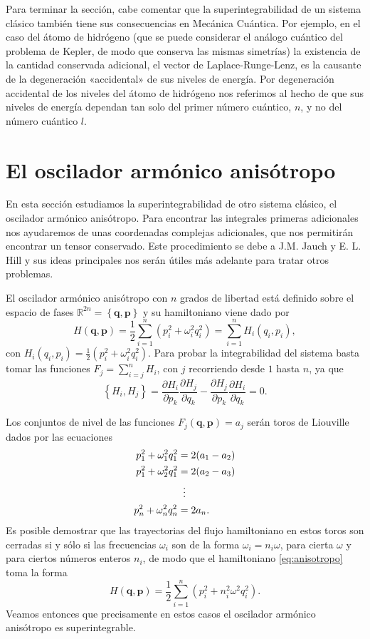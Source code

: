 \documentclass[12pt,a4paper,twoside]{article}
\theoremstyle{definition} \newtheorem{defn}[thm]{Definición}
\theoremstyle{definition} \newtheorem{ejemplo}[thm]{Ejemplo}
\theoremstyle{definition} \newtheorem{ejercicio}[thm]{Ejercicio}
\theoremstyle{remark} \newtheorem*{obs}{Observación}
\def\RR{\mathbb{R}}
\newcommand{\vect}[1]{\mathbf{#1}}
\newcommand{\parcial}[2]{\frac{\partial #1}{\partial #2}}
\begin{document}
Para terminar la sección, cabe comentar que la superintegrabilidad de un sistema clásico también tiene sus consecuencias en Mecánica Cuántica. Por ejemplo, en el caso del átomo de hidrógeno (que se puede considerar el análogo cuántico del problema de Kepler, de modo que conserva las mismas simetrías) la existencia de la cantidad conservada adicional, el vector de Laplace-Runge-Lenz, es la causante de la degeneración «accidental» de sus niveles de energía. Por degeneración accidental de los niveles del átomo de hidrógeno nos referimos al hecho de que sus niveles de energía dependan tan solo del primer número cuántico, $n$, y no del número cuántico $l$.

\section{El oscilador armónico anisótropo}
En esta sección estudiamos la superintegrabilidad de otro sistema clásico, el oscilador armónico anisótropo. Para encontrar las integrales primeras adicionales nos ayudaremos de unas coordenadas complejas adicionales, que nos permitirán encontrar un tensor conservado. Este procedimiento se debe a J.M. Jauch y E. L. Hill \cite{jauchhill} y sus ideas principales nos serán útiles más adelante para tratar otros problemas.

El oscilador armónico anisótropo con $n$ grados de libertad está definido sobre el espacio de fases $\RR^{2n}=\left\{ \vect{q},\vect{p} \right\}$ y su hamiltoniano viene dado por
\begin{equation}
  H(\vect{q},\vect{p})=\frac{1}{2}\sum_{i=1}^n \left(p_i^2 + \omega_i^2q_i^2\right)=\sum_{i=1}^n H_i(q_i,p_i),
  \label{eq:anisotropo}
\end{equation}
con $H_i(q_i,p_i)=\frac{1}{2}(p_i^2+\omega_i^2q_i^2)$. Para probar la integrabilidad del sistema basta tomar las funciones $F_j=\sum_{i=j}^n H_i$, con $j$ recorriendo desde $1$ hasta $n$, ya que
\begin{equation*}
  \left\{ H_i,H_j \right\}=\parcial{H_i}{p_k}\parcial{H_j}{q_k}-\parcial{H_j}{p_k}\parcial{H_i}{q_k}=0.
\end{equation*}

Los conjuntos de nivel de las funciones $F_j(\vect{q},\vect{p})=a_j$ serán toros de Liouville dados por las ecuaciones
\begin{align*}[left=\empheqlbrace]
    p_1^2+\omega_1^2q_1^2&= 2(a_1-a_2)\\
    p_1^2+\omega_2^2q_1^2&= 2(a_2-a_3)\\
    &\vdotswithin{=} \\
    p_n^2+\omega_n^2q_n^2&= 2a_n.
\end{align*}
Es posible demostrar que las trayectorias del flujo hamiltoniano en estos toros son cerradas si y sólo si las frecuencias $\omega_i$ son de la forma $\omega_i=n_i \omega$, para cierta $\omega$ y para ciertos números enteros $n_i$, de modo que el hamiltoniano \eqref{eq:anisotropo} toma la forma
\begin{equation}
  H(\vect{q},\vect{p})=\frac{1}{2}\sum_{i=1}^n \left(p_i^2 + n_i^2\omega^2q_i^2\right).
\end{equation}
Veamos entonces que precisamente en estos casos el oscilador armónico anisótropo es superintegrable.
\end{document}
